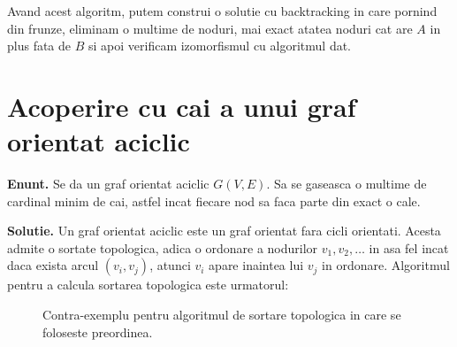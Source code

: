 Avand acest algoritm, putem construi o solutie cu backtracking in care pornind din frunze, eliminam o multime de noduri, mai exact atatea
noduri cat are $A$ in plus fata de $B$ si apoi verificam izomorfismul cu algoritmul dat.

\pagebreak

\section{Acoperire cu cai a unui graf orientat aciclic}

\noindent \textbf{Enunt.} Se da un graf orientat aciclic $G(V, E)$. Sa se gaseasca o multime de cardinal minim de cai, astfel incat
fiecare nod sa faca parte din exact o cale.

\noindent \textbf{Solutie.} Un graf orientat aciclic este un graf orientat fara cicli orientati. Acesta admite o sortate topologica,
adica o ordonare a nodurilor $v_{1}, v_{2}, \ldots$ in asa fel incat daca exista arcul $(v_{i}, v_{j})$, atunci $v_{i}$ apare inaintea
lui $v_{j}$ in ordonare. Algoritmul pentru a calcula sortarea topologica este urmatorul:

\begin{algorithm}[H]
  \DontPrintSemicolon
  \;
\end{algorithm}

\begin{algorithm}[H]
  \DontPrintSemicolon
  \;
\end{algorithm}

\pagebreak

\begin{figure}
  \caption{Contra-exemplu pentru algoritmul de sortare topologica in care se foloseste preordinea.}
  \centering
\end{figure}

